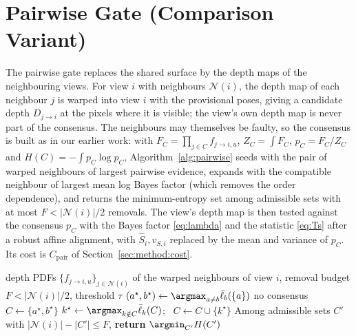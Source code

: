 \section{Pairwise Gate (Comparison Variant)}
\label{app:pairwise}
The pairwise gate replaces the shared surface by the depth maps of the neighbouring views.
For view $i$ with neighbours $\mathcal{N}(i)$, the depth map of each neighbour $j$ is warped
into view $i$ with the provisional poses, giving a candidate depth $D_{j\to i}$ at the
pixels where it is visible; the view's own depth map is never part of the consensus. The
neighbours may themselves be faulty, so the consensus is built as in our earlier work: with
$F_C=\prod_{j\in C}f_{j\to i,u}$, $Z_C=\int F_C$, $p_C=F_C/Z_C$ and $H(C)=-\!\int p_C\log p_C$,
Algorithm~\ref{alg:pairwise} seeds with the pair of warped neighbours of largest pairwise
evidence, expands with the compatible neighbour of largest mean log Bayes factor (which
removes the order dependence), and returns the minimum-entropy set among admissible sets
with at most $F<|\mathcal{N}(i)|/2$ removals. The view's depth map is then tested against
the consensus $p_C$ with the Bayes factor \eqref{eq:lambda} and the statistic
\eqref{eq:Ts} after a robust affine alignment, with $\hat S_i,v_{S,i}$ replaced by the mean
and variance of $p_C$. Its cost is $C_{\mathrm{pair}}$ of Section~\ref{sec:method:cost}.

\begin{algorithm}[t]
\caption{Pairwise consensus among warped neighbours (comparison variant)}
\label{alg:pairwise}
\begin{algorithmic}[1]
\REQUIRE depth PDFs $\{f_{j\to i,u}\}_{j\in\mathcal{N}(i)}$ of the warped neighbours of view $i$, removal budget $F<|\mathcal{N}(i)|/2$, threshold $\tau$
\STATE $(a^\star,b^\star)\gets\argmax_{a\ne b}\bar\ell_{b}(\{a\})$
  \RETURN no consensus
\ENDIF
\STATE $C\gets\{a^\star,b^\star\}$
  \STATE $k^\star\gets\argmax_{k\notin C}\bar\ell_k(C)$; \ $C\gets C\cup\{k^\star\}$
\ENDWHILE
\STATE Among admissible sets $C'$ with $|\mathcal{N}(i)|-|C'|\le F$, \textbf{return} $\argmin_{C'}H(C')$
\end{algorithmic}
\end{algorithm}


